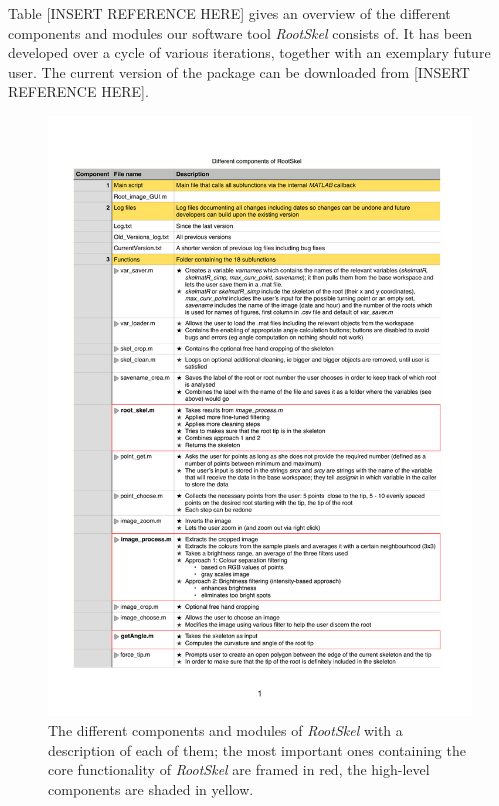 %


Table [INSERT REFERENCE HERE] gives an overview of the different components and modules our software tool \textit{RootSkel} consists of. It has been developed over a cycle of various iterations, together with an exemplary future user. 
The current version of the package can be downloaded from [INSERT REFERENCE HERE]. %


\begin{figure}[h]
	\centering
	\includegraphics[width=\textwidth]{../Figures/components.pdf}
	\caption{The different components and modules of \textit{RootSkel} with a description of each of them; the most important ones containing the core functionality of \textit{RootSkel} are framed in red, the high-level components are shaded in yellow.}
	\label{fig:modules}
\end{figure}



